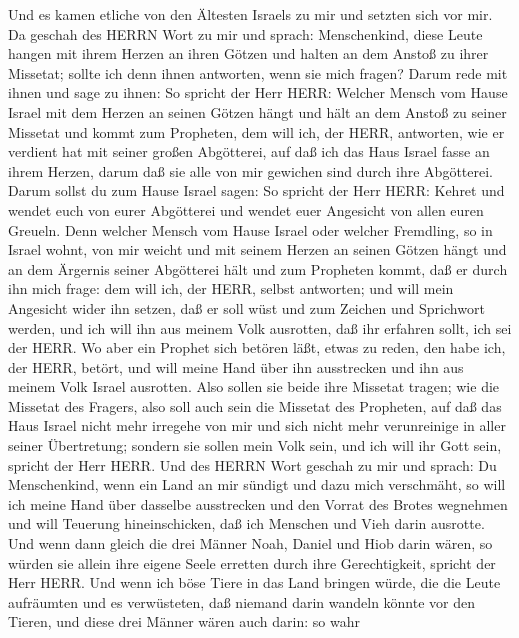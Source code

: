  Und es kamen etliche von den Ältesten Israels zu mir und
setzten sich vor mir.  Da geschah des HERRN Wort zu mir und
sprach:  Menschenkind, diese Leute hangen mit ihrem Herzen
an ihren Götzen und halten an dem Anstoß zu ihrer Missetat; sollte ich
denn ihnen antworten, wenn sie mich fragen?  Darum rede mit
ihnen und sage zu ihnen: So spricht der Herr HERR: Welcher Mensch vom
Hause Israel mit dem Herzen an seinen Götzen hängt und hält an dem
Anstoß zu seiner Missetat und kommt zum Propheten, dem will ich, der
HERR, antworten, wie er verdient hat mit seiner großen Abgötterei,
 auf daß ich das Haus Israel fasse an ihrem Herzen, darum
daß sie alle von mir gewichen sind durch ihre Abgötterei. 
Darum sollst du zum Hause Israel sagen: So spricht der Herr HERR: Kehret
und wendet euch von eurer Abgötterei und wendet euer Angesicht von allen
euren Greueln.  Denn welcher Mensch vom Hause Israel oder
welcher Fremdling, so in Israel wohnt, von mir weicht und mit seinem
Herzen an seinen Götzen hängt und an dem Ärgernis seiner Abgötterei hält
und zum Propheten kommt, daß er durch ihn mich frage: dem will ich, der
HERR, selbst antworten;  und will mein Angesicht wider ihn
setzen, daß er soll wüst und zum Zeichen und Sprichwort werden, und ich
will ihn aus meinem Volk ausrotten, daß ihr erfahren sollt, ich sei der
HERR.  Wo aber ein Prophet sich betören läßt, etwas zu
reden, den habe ich, der HERR, betört, und will meine Hand über ihn
ausstrecken und ihn aus meinem Volk Israel ausrotten.  Also
sollen sie beide ihre Missetat tragen; wie die Missetat des Fragers,
also soll auch sein die Missetat des Propheten,  auf daß
das Haus Israel nicht mehr irregehe von mir und sich nicht mehr
verunreinige in aller seiner Übertretung; sondern sie sollen mein Volk
sein, und ich will ihr Gott sein, spricht der Herr HERR. 
Und des HERRN Wort geschah zu mir und sprach:  Du
Menschenkind, wenn ein Land an mir sündigt und dazu mich verschmäht, so
will ich meine Hand über dasselbe ausstrecken und den Vorrat des Brotes
wegnehmen und will Teuerung hineinschicken, daß ich Menschen und Vieh
darin ausrotte.  Und wenn dann gleich die drei Männer Noah,
Daniel und Hiob darin wären, so würden sie allein ihre eigene Seele
erretten durch ihre Gerechtigkeit, spricht der Herr HERR. 
Und wenn ich böse Tiere in das Land bringen würde, die die Leute
aufräumten und es verwüsteten, daß niemand darin wandeln könnte vor den
Tieren,  und diese drei Männer wären auch darin: so wahr
